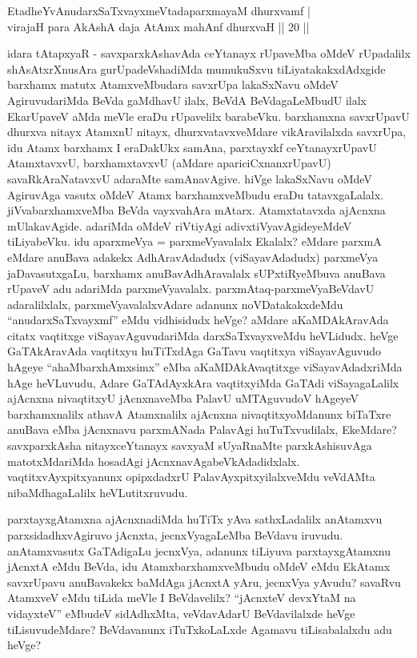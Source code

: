 \begin{shl}
EtadheYvAnudarxSaTxvayxmeVtadaparxmayaM dhurxvamf |\\
virajaH para AkAshA daja AtAmx mahAnf dhurxvaH || 20 ||
\end{shl}

\begin{artha}
idara tAtapxyaR - savxparxkAshavAda ceYtanayx rUpaveMba oMdeV rUpadalilx shAsAtxrXnusAra gurUpadeVshadiMda mumukuSxvu tiLiyatakakxdAdxgide barxhamx \ndash  matutx AtamxveMbudara savxrUpa lakaSxNavu oMdeV AgiruvudariMda BeVda gaMdhavU ilalx, BeVdA BeVdagaLeMbudU ilalx EkarUpaveV aMda meVle eraDu rUpavelilx barabeVku. barxhamxna savxrUpavU dhurxva nitayx AtamxnU nitayx, dhurxvatavxveMdare vikAravilalxda savxrUpa, idu Atamx barxhamx I eraDakUkx samAna, parxtayxkf ceYtanayxrUpavU AtamxtavxvU, barxhamxtavxvU (aMdare apariciCxnanxrUpavU) savaRkAraNatavxvU adaraMte samAnavAgive. hiVge lakaSxNavu oMdeV AgiruvAga vasutx oMdeV Atamx barxhamxveMbudu eraDu tatavxgaLalalx. jiVvabarxhamxveMba BeVda vayxvahAra mAtarx. Atamxtatavxda ajAcnxna mUlakavAgide. adariMda oMdeV riVtiyAgi adivxtiVyavAgideyeMdeV tiLiyabeVku. idu aparxmeVya = parxmeVyavalalx Ekalalx? eMdare parxmA eMdare anuBava adakekx AdhAravAdadudx (viSayavAdadudx) parxmeVya jaDavasutxgaLu, barxhamx anuBavAdhAravalalx sUPxtiRyeMbuva anuBava rUpaveV adu adariMda parxmeVyavalalx. parxmAtaq-parxmeVyaBeVdavU adaralilxlalx, parxmeVyavalalxvAdare adanunx noVDatakakxdeMdu ``anudarxSaTxvayxmf'' eMdu vidhisidudx heVge? aMdare aKaMDAkAravAda citatx vaqtitxge viSayavAguvudariMda darxSaTxvayxveMdu heVLidudx. heVge GaTAkAravAda vaqtitxyu huTiTxdAga GaTavu vaqtitxya viSayavAguvudo hAgeye ``ahaMbarxhAmxsimx'' eMba aKaMDAkAvaqtitxge viSayavAdadxriMda hAge heVLuvudu, Adare GaTAdAyxkAra vaqtitxyiMda GaTAdi viSayagaLalilx ajAcnxna nivaqtitxyU jAcnxnaveMba PalavU uMTAguvudoV hAgeyeV barxhamxnalilx athavA Atamxnalilx ajAcnxna nivaqtitxyoMdanunx biTaTxre anuBava eMba jAcnxnavu parxmANada PalavAgi huTuTxvudilalx, EkeMdare? savxparxkAsha nitayxceYtanayx savxyaM sUyaRnaMte parxkAshisuvAga matotxMdariMda hosadAgi jAcnxnavAgabeVkAdadidxlalx. vaqtitxvAyxpitxyanunx opipxdadxrU PalavAyxpitxyilalxveMdu veVdAMta nibaMdhagaLalilx heVLutitxruvudu.

parxtayxgAtamxna ajAcnxnadiMda huTiTx yAva sathxLadalilx anAtamxvu parxsidadhxvAgiruvo jAcnxta, jecnxVyagaLeMba BeVdavu iruvudu. anAtamxvasutx GaTAdigaLu jecnxVya, adanunx tiLiyuva parxtayxgAtamxnu jAcnxtA eMdu BeVda, idu AtamxbarxhamxveMbudu oMdeV eMdu EkAtamx savxrUpavu anuBavakekx baMdAga jAcnxtA yAru, jecnxVya yAvudu?  savaRvu AtamxveV eMdu tiLida meVle I BeVdavelilx? ``jAcnxteV devxYtaM na vidayxteV'' eMbudeV sidAdhxMta, veVdavAdarU BeVdavilalxde heVge tiLisuvudeMdare? BeVdavanunx iTuTxkoLaLxde Agamavu tiLisabalalxdu adu heVge? 
\end{artha}


